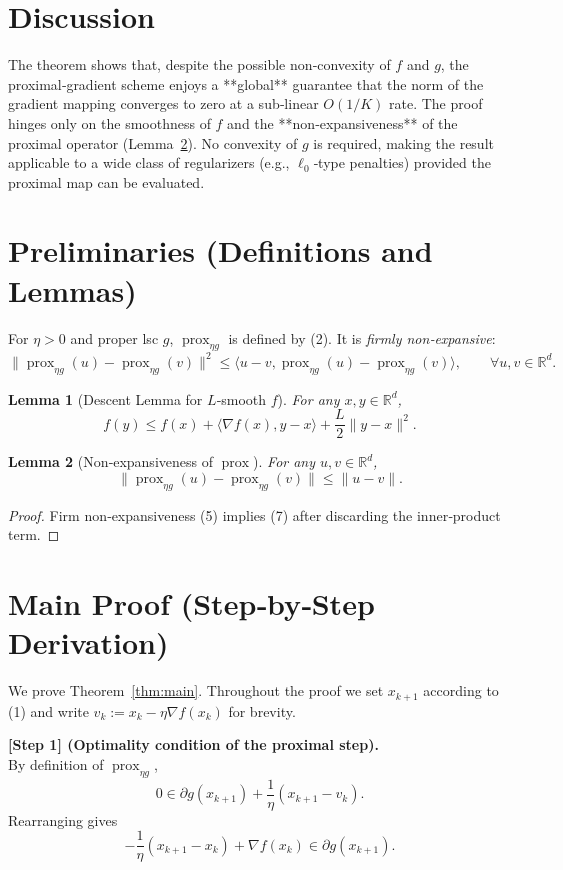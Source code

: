 \documentclass{article}
\newtheorem{lemma}{Lemma}
\newcommand{\prox}{\operatorname{prox}}
\newcommand{\grad}{\nabla}
\newcommand{\R}{\mathbb{R}}
\begin{document}
\section*{Discussion}
The theorem shows that, despite the possible non‑convexity of $f$ and $g$, the proximal‑gradient scheme enjoys a **global** guarantee that the norm of the gradient mapping converges to zero at a sub‑linear $O(1/K)$ rate. The proof hinges only on the smoothness of $f$ and the **non‑expansiveness** of the proximal operator (Lemma~\ref{lem:nonexp}). No convexity of $g$ is required, making the result applicable to a wide class of regularizers (e.g., $\ell_0$‑type penalties) provided the proximal map can be evaluated.

\newpage

\section*{Preliminaries (Definitions and Lemmas)}
\begin{definition}
For $\eta>0$ and proper lsc $g$, $\prox_{\eta g}$ is defined by (2). It is \emph{firmly non‑expansive}:
\[
\|\prox_{\eta g}(u)-\prox_{\eta g}(v)\|^2\le \langle u-v,\prox_{\eta g}(u)-\prox_{\eta g}(v)\rangle,
\qquad\forall u,v\in\R^d.
\tag{5}
\]
\end{definition}
\begin{lemma}[Descent Lemma for $L$‑smooth $f$]\label{lem:descent}
For any $x,y\in\R^d$,
\[
f(y)\le f(x)+\langle\grad f(x),y-x\rangle+\frac{L}{2}\|y-x\|^2.
\tag{6}
\]
\end{lemma}
\begin{lemma}[Non‑expansiveness of $\prox$]\label{lem:nonexp}
For any $u,v\in\R^d$,
\[
\|\prox_{\eta g}(u)-\prox_{\eta g}(v)\|\le\|u-v\|.
\tag{7}
\]
\end{lemma}
\begin{proof}
Firm non‑expansiveness (5) implies (7) after discarding the inner‑product term.
\end{proof}

\section*{Main Proof (Step‑by‑Step Derivation)}
We prove Theorem~\ref{thm:main}. Throughout the proof we set $x_{k+1}$ according to (1) and write $v_k:=x_k-\eta\grad f(x_k)$ for brevity.

\bigskip
\noindent\textbf{[Step 1] (Optimality condition of the proximal step).}\\
By definition of $\prox_{\eta g}$,
\[
0\in \partial g(x_{k+1})+\frac{1}{\eta}(x_{k+1}-v_k).
\tag{8}
\]
Rearranging gives
\[
-\frac{1}{\eta}(x_{k+1}-x_k)+\grad f(x_k)\in \partial g(x_{k+1}).
\tag{9}
\]
\end{document}
